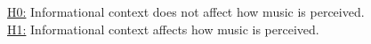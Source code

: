 \documentclass{article}
\begin{document}
\noindent \underline{H0:} Informational context does not affect how music is perceived.\\
\underline{H1:} Informational context affects how music is perceived.\\
\end{document}

